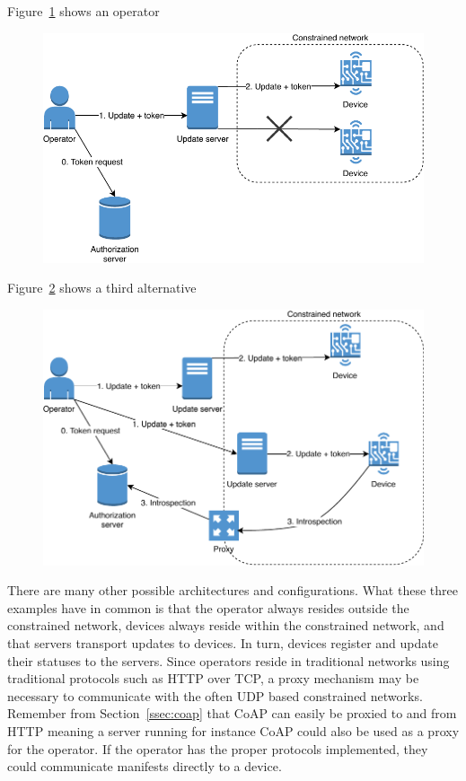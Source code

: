 \documentclass[0-thesis.tex]{subfiles}
\begin{document}
Figure~\ref{fig:operator-proxy} shows an operator 

\begin{figure}
    \caption{}
    \label{fig:operator-proxy}
    \includegraphics{images/operator-indirect.pdf}
\end{figure}

Figure~\ref{fig:operator-server} shows a third alternative 

\begin{figure}
    \caption{}
    \label{fig:operator-server}
    \includegraphics{images/operator-introspection.pdf}
\end{figure}

There are many other possible architectures and configurations. What these three examples
have in common is that the operator always resides outside the constrained network,
devices always reside within the constrained network, and that servers transport updates
to devices. In turn, devices register and update their statuses to the servers. Since
operators reside in traditional networks using traditional protocols such as HTTP over
TCP, a proxy mechanism may be necessary to communicate with the often UDP based
constrained networks. Remember from Section~\ref{ssec:coap} that CoAP can easily be
proxied to and from HTTP meaning a server running for instance CoAP could also be used as
a proxy for the operator. If the operator has the proper protocols implemented, they could
communicate manifests directly to a device.
\end{document}
